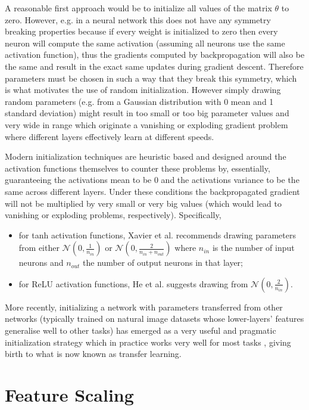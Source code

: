 A reasonable first approach would be to initialize all values of the matrix $\theta$ to zero. However, e.g. in a neural network this does not have any symmetry breaking properties because if every weight is initialized to zero then every neuron will compute the same activation (assuming all neurons use the same activation function), thus the gradients computed by backpropagation will also be the same and result in the exact same updates during gradient descent. Therefore parameters must be chosen in such a way that they break this symmetry, which is what motivates the use of random initialization. However simply drawing random parameters (e.g. from a Gaussian distribution with 0 mean and 1 standard deviation) might result in too small or too big parameter values and very wide in range which originate a vanishing or exploding gradient problem where different layers effectively learn at different speeds.

Modern initialization techniques are heuristic based and designed around the activation functions themselves to counter these problems by, essentially, guaranteeing the activations mean to be $0$ and the activations variance to be the same across different layers. Under these conditions the backpropagated gradient will not be multiplied by very small or very big values (which would lead to vanishing or exploding problems, respectively). Specifically,

\begin{itemize}
    \item for tanh activation functions, Xavier et al.\cite{xavierinit} recommends drawing parameters from either $\mathcal{N}(0, \frac{1}{n_{in}})$ or $\mathcal{N}(0, \frac{2}{n_{in}+n_{out}})$ where $n_{in}$ is the number of input neurons and $n_{out}$ the number of output neurons in that layer;
    \item for ReLU activation functions, He et al.\cite{heinit} suggests drawing from $\mathcal{N}(0, \frac{2}{n_{in}})$.
\end{itemize}

More recently, initializing a network with parameters transferred from other networks (typically trained on natural image datasets whose lower-layers' features generalise well to other tasks) has emerged as a very useful and pragmatic initialization strategy which in practice works very well for most tasks \cite{howtransferable}, giving birth to what is now known as transfer learning.

\section{Feature Scaling}

